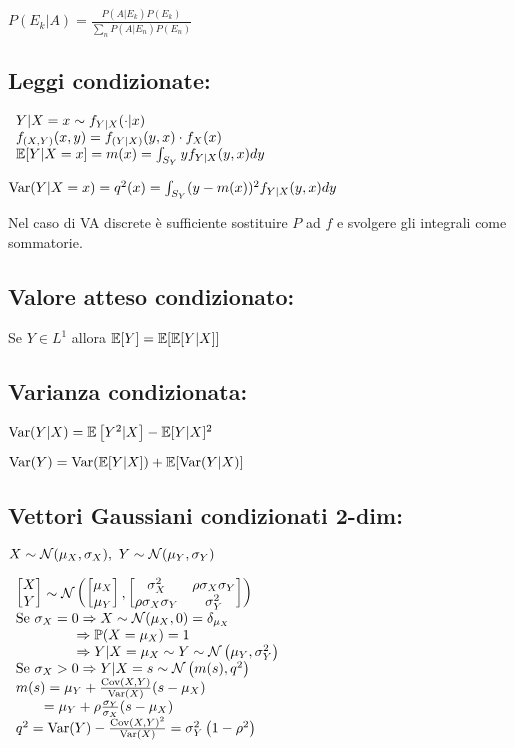 $P( E_k |A) =\frac{P( A|E_k) P( E_k)}{\sum_n P( A|E_n) P( E_n)}$
\subsection{Leggi condizionate:}

$ \begin{array}{l}
Y|X=x\sim f_{Y|X} (\cdot |x)\\
f_{(X,Y)} (x,y)=f_{(Y|X)} (y,x)\cdot f_X (x)\\
\mathbb E[Y|X=x]=m(x)=\int_{S_Y} yf_{Y|X} (y,x)dy
\end{array}$

$\operatorname{Var}(Y|X=x)=q^2 (x)=\int_{S_Y} (y-m(x))^2 f_{Y|X} (y,x)dy$

Nel caso di VA discrete è sufficiente sostituire $P$ ad $f$ e svolgere gli integrali come sommatorie.
\subsection{Valore atteso condizionato:}

Se $Y\in L^1$ allora $\mathbb E[Y]=\mathbb E[\mathbb E[Y|X]]$
\subsection{Varianza condizionata:}

$\operatorname{Var}(Y|X)=\mathbb E\left[ Y^2 |X\right] -\mathbb E[Y|X]^2$

$\operatorname{Var}(Y)=\operatorname{Var}(\mathbb E[Y|X])+\mathbb E[\operatorname{Var}(Y|X)]$
\subsection{Vettori Gaussiani condizionati 2-dim:}

$X\sim \mathcal N( \mu_X ,\sigma_X) ,\ Y\sim \mathcal N( \mu_Y ,\sigma_Y)$

$ \begin{array}{l}
\begin{bmatrix}
X\\
Y
\end{bmatrix} \sim \mathcal N\left(\begin{bmatrix}
\mu_X\\
\mu_Y
\end{bmatrix} ,\begin{bmatrix}
\sigma^2_X & \rho \sigma_X \sigma_Y\\
\rho \sigma_X \sigma_Y & \sigma^2_Y
\end{bmatrix}\right)\\
\text{Se} \ \sigma_X =0\Rightarrow X\sim \mathcal N( \mu_X ,0) =\delta_{\mu_X}\\
\ \ \ \ \ \ \ \ \ \ \ \ \ \Rightarrow \mathbb P( X=\mu_X) =1\\
\ \ \ \ \ \ \ \ \ \ \ \ \ \Rightarrow Y|X=\mu_X \sim Y\sim \mathcal N\left( \mu_Y ,\sigma^2_Y\right)\\
\text{Se} \ \sigma_X >0\Rightarrow Y|X=s\sim \mathcal N\left( m(s),q^2\right)\\
m(s)=\mu_Y +\frac{\operatorname{Cov}(X,Y)}{\operatorname{Var}(X)}( s-\mu_X)\\
\ \ \ \ \ \ =\mu_Y +\rho \frac{\sigma_Y}{\sigma_X} (s-\mu_X)\\
q^2 =\operatorname{Var}(Y)-\frac{\operatorname{Cov}(X,Y)^2}{\operatorname{Var}(X)} =\sigma^2_Y\left( 1-\rho^2\right)
\end{array}$
